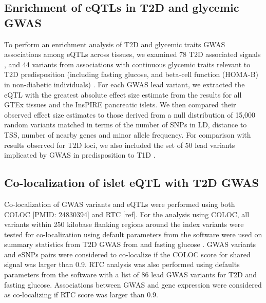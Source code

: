 \subsection{Enrichment of eQTLs in T2D and glycemic GWAS}
To perform an enrichment analysis of T2D and glycemic traits GWAS associations among eQTLs across tissues, we examined 78 T2D associated signals \cite{fuchsbergerGeneticArchitectureType2016a}, and 44 variants from associations with continuous glycemic traits relevant to T2D predisposition (including fasting glucose, and beta-cell function (HOMA-B) in non-diabetic individuals) \cite{scottLargescaleAssociationAnalyses2012, strawbridgeGenomeWideAssociationIdentifies2011, manningfoxHumanIsletFunction2015}. For each GWAS lead variant, we extracted the eQTL with the greatest absolute effect size estimate from the results for all GTEx tissues and the InsPIRE pancreatic islets. We then compared their observed effect size estimates to those derived from a null distribution of 15,000 random variants matched in terms of the number of SNPs in LD, distance to TSS, number of nearby genes and minor allele frequency. For comparison with results observed for T2D loci, we also included the set of 50 lead variants implicated by GWAS in predisposition to T1D \cite{onengut-gumuscuFineMappingType2015}.

\subsection{Co-localization of islet eQTL with T2D GWAS}
Co-localization of GWAS variants and eQTLs were performed using both COLOC [PMID: 24830394] and RTC [ref]. For the analysis using COLOC, all variants within 250 kilobase flanking regions around the index variants were tested for co-localization using default parameters from the software were used on summary statistics from T2D GWAS from \cite{scottExpandedGenomeWideAssociation2017} and fasting glucose \cite{manningGenomewideApproachAccounting2012}. GWAS variants and eSNPs pairs were considered to co-localize if the COLOC score for shared signal was larger than 0.9. RTC analysis was also performed using defaults parameters from the software with a list of 86 lead GWAS variants for T2D and fasting glucose. Associations between GWAS and gene expression were considered as co-localizing if RTC score was larger than 0.9. 

